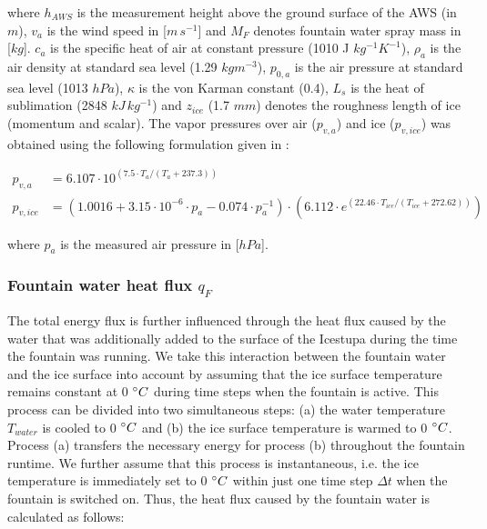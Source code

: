 \documentclass[utf8]{frontiersSCNS} %
\begin{document}
where $h_{AWS}$ is the measurement height above the ground surface of the AWS (in $m$), $v_a$ is the wind speed in
[$m\,s^{-1}$] and $M_{F}$ denotes fountain water spray mass in [$kg$]. $c_a$ is the specific heat of air at constant
pressure (1010 J $kg^{-1} K^{-1}$), $\rho_{a}$ is the air density at standard sea level (1.29 $kg m^{-3}$), $p_{0,a}$ is
the air pressure at standard sea level (1013 $hPa$), $\kappa$ is the von Karman constant (0.4), $L_s$ is the heat of
sublimation (2848 $kJ\, kg^{-1}$) and $z_{ice}$ (1.7 $mm$) denotes the roughness length of ice (momentum and scalar).
The vapor pressures over air ($p_{v,a}$) and ice ($p_{v,ice}$) was obtained using the following formulation given in
\cite{WMO_2018}:

\begin{equation} \begin{split} p_{v,a}&=6.107 \cdot 10^{(7.5 \cdot T_a / (T_a + 237.3))}\\ p_{v,ice}&=(1.0016 +
3.15\cdot10^{-6}\cdot p_{a}-0.074\cdot p_{a}^{-1})\cdot(6.112 \cdot e^{(22.46 \cdot T_{ice} / (T_{ice} + 272.62))})
\end{split} \label{eqn:vp} \end{equation}

where $p_{a}$ is the measured air pressure in [$hPa$].  

\subsubsection{Fountain water heat flux
\texorpdfstring{$q_{F}$}{Lg} }

The total energy flux is further influenced through the heat flux caused by the water that was additionally added to the
surface of the Icestupa during the time the fountain was running. We take this interaction between the fountain water
and the ice surface into account by assuming that the ice surface temperature remains constant at 0 $\degree C$
during time steps when the fountain is active. This process can be divided into two simultaneous steps: (a) the water
temperature $T_{water}$ is cooled to 0 $\degree C$ and (b) the ice surface temperature is warmed to 0 $\degree C$.
Process (a) transfers the necessary energy for process (b) throughout the fountain runtime. We further assume
that this process is instantaneous, i.e. the ice temperature is immediately set to 0 $\degree C$ within just one time
step $\Delta t$ when the fountain is switched on. Thus, the heat flux caused by the fountain water is calculated as
follows:
\end{document}
